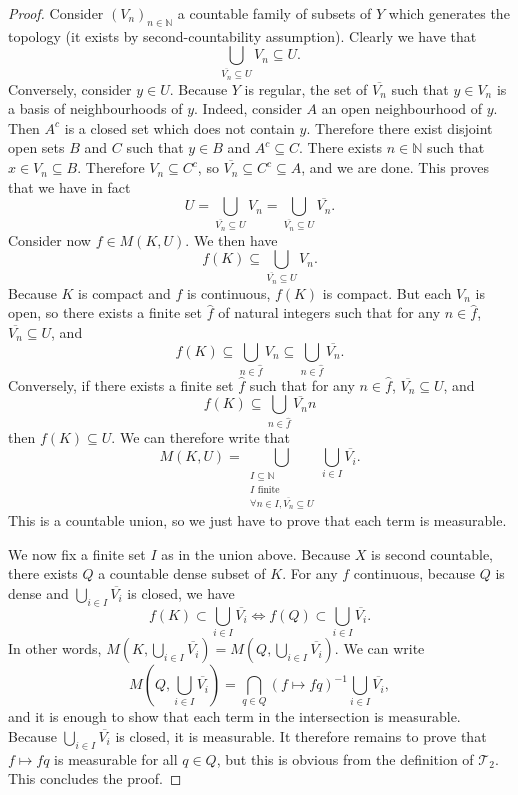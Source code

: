\begin{proof}
Consider $(V_n)_{n \in \mathbb{N}}$ a countable family of subsets of $Y$ which generates the topology (it exists by second-countability assumption). Clearly we have that
$$\bigcup_{\overline{V_n} \subseteq U} V_n \subseteq U.$$
Conversely, consider $y \in U$. Because $Y$ is regular, the set of $\overline{V_n}$ such that $y \in V_n$ is a basis of neighbourhoods of $y$. Indeed, consider $A$ an open neighbourhood of $y$. Then $A^c$ is a closed set which does not contain $y$. Therefore there exist disjoint open sets $B$ and $C$ such that $y \in B$ and $A^c \subseteq C$. There exists $n \in \mathbb{N}$ such that $x \in V_n \subseteq B$. Therefore $V_n \subseteq C^c$, so $\overline{V_n} \subseteq C^c \subseteq A$, and we are done. This proves that we have in fact
$$U = \bigcup_{\overline{V_n} \subseteq U} V_n = \bigcup_{\overline{V_n} \subseteq U} \overline{V_n}.$$
Consider now $f \in M(K, U)$. We then have
$$f(K) \subseteq \bigcup_{\overline{V_n} \subseteq U} V_n.$$
Because $K$ is compact and $f$ is continuous, $f(K)$ is compact. But each $V_n$ is open, so there exists a finite set $\hat{f}$ of natural integers such that for any $n \in \hat{f}$, $\overline{V_n} \subseteq U$, and
$$f(K) \subseteq \bigcup_{n \in \hat{f}} V_n \subseteq \bigcup_{n \in \hat{f}} \overline{V_n}.$$
Conversely, if there exists a finite set $\hat{f}$ such that for any $n \in \hat{f}$, $\overline{V_n} \subseteq U$, and
$$f(K) \subseteq \bigcup_{n \in \hat{f}} \overline{V_n}n$$
then $f(K) \subseteq U$. We can therefore write that
$$M(K, U) = \bigcup_{\substack{I \subseteq \mathbb{N} \\ I \text{ finite} \\ \forall n \in I, \overline{V_n} \subseteq U}} \bigcup_{i \in I} \overline{V_i}.$$
This is a countable union, so we just have to prove that each term is measurable.

We now fix a finite set $I$ as in the union above. Because $X$ is second countable, there exists $Q$ a countable dense subset of $K$. For any $f$ continuous, because $Q$ is dense and $\bigcup_{i \in I} \overline{V_i}$ is closed, we have
$$f(K) \subset \bigcup_{i \in I} \overline{V_i} \Longleftrightarrow f(Q) \subset \bigcup_{i \in I} \overline{V_i}.$$
In other words, $M\left(K, \bigcup_{i \in I} \overline{V_i}\right) = M\left(Q, \bigcup_{i \in I} \overline{V_i}\right)$. We can write
$$M\left(Q, \bigcup_{i \in I} \overline{V_i}\right) = \bigcap_{q \in Q} (f \mapsto f q)^{-1} \bigcup_{i \in I} \overline{V_i},$$
and it is enough to show that each term in the intersection is measurable. Because $\bigcup_{i \in I} \overline{V_i}$ is closed, it is measurable. It therefore remains to prove that $f \mapsto f q$ is measurable for all $q \in Q$, but this is obvious from the definition of $\mathcal{T}_2$. This concludes the proof.
\end{proof}


